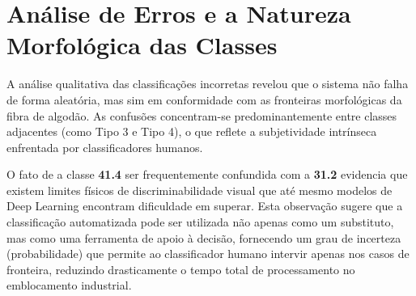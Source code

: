 \section{Análise de Erros e a Natureza Morfológica das Classes}

A análise qualitativa das classificações incorretas revelou que o sistema não falha de forma aleatória, mas sim em conformidade com as fronteiras morfológicas da fibra de algodão. As confusões concentram-se predominantemente entre classes adjacentes (como Tipo 3 e Tipo 4), o que reflete a subjetividade intrínseca enfrentada por classificadores humanos.

O fato de a classe \textbf{41.4} ser frequentemente confundida com a \textbf{31.2} evidencia que existem limites físicos de discriminabilidade visual que até mesmo modelos de Deep Learning encontram dificuldade em superar. Esta observação sugere que a classificação automatizada pode ser utilizada não apenas como um substituto, mas como uma ferramenta de apoio à decisão, fornecendo um grau de incerteza (probabilidade) que permite ao classificador humano intervir apenas nos casos de fronteira, reduzindo drasticamente o tempo total de processamento no emblocamento industrial.
